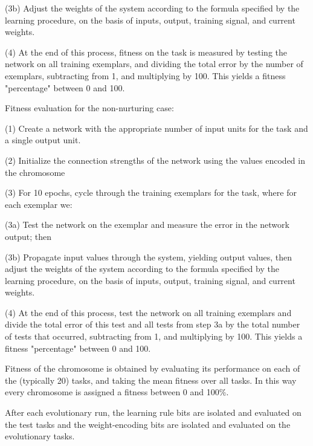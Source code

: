 \documentclass[master]{outhesis}
\begin{document}
(3b) Adjust the weights of the system according to the formula specified by the learning procedure, on the basis of inputs, output, training signal, and current weights.

(4) At the end of this process, fitness on the task is measured by testing the network on all training exemplars, and dividing the total error by the number of exemplars, subtracting from 1, and multiplying by 100. This yields a fitness "percentage" between 0 and 100.

Fitness evaluation for the non-nurturing case:

(1) Create a network with the appropriate number of input units for the task and a single output unit.

(2) Initialize the connection strengths of the network using the values encoded in the chromosome

(3) For 10 epochs, cycle through the training exemplars for the task, where for each exemplar we:

(3a) Test the network on the exemplar and measure the error in the network output; then

(3b) Propagate input values through the system, yielding output values, then adjust the weights of the system according to the formula specified by the learning procedure, on the basis of inputs, output, training signal, and current weights.

(4) At the end of this process, test the network on all training exemplars and divide the total error of this test and all tests from step 3a by the total number of tests that occurred, subtracting from 1, and multiplying by 100. This yields a fitness "percentage" between 0 and 100.

Fitness of the chromosome is obtained by evaluating its performance on each of the (typically 20) tasks, and taking the mean fitness over all tasks. In this way every chromosome is assigned a fitness between 0 and 100\%.

After each evolutionary run, the learning rule bits are isolated and evaluated on the test tasks and the weight-encoding bits are isolated and evaluated on the evolutionary tasks.

\makebackmatter
\end{document}
